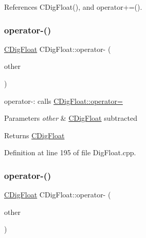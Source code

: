 References C\+Dig\+Float(), and operator+=().

\mbox{\label{classCDigFloat_a8f94e4b416b59090743e59cb9423dbca}} 
\subsubsection{\texorpdfstring{operator-\/()}{operator-()}\hspace{0.1cm}{\footnotesize\ttfamily [1/2]}}
{\footnotesize\ttfamily \hyperlink{classCDigFloat}{C\+Dig\+Float} C\+Dig\+Float\+::operator-\/ (\begin{DoxyParamCaption}\item[{const \hyperlink{classCDigFloat}{C\+Dig\+Float} \&}]{other }\end{DoxyParamCaption})}



operator-\/\+: calls \hyperlink{classCDigFloat_a74f36566c2c79d7258b7b2dee35d46b2}{C\+Dig\+Float\+::operator=} 


\begin{DoxyParams}{Parameters}
{\em other} & \hyperlink{classCDigFloat}{C\+Dig\+Float} subtracted \\
\hline
\end{DoxyParams}
\begin{DoxyReturn}{Returns}
\hyperlink{classCDigFloat}{C\+Dig\+Float} 
\end{DoxyReturn}


Definition at line 195 of file Dig\+Float.\+cpp.

\mbox{\label{classCDigFloat_ad873c5c22f0f18e89caf7309a043bfa0}} 
\subsubsection{\texorpdfstring{operator-\/()}{operator-()}\hspace{0.1cm}{\footnotesize\ttfamily [2/2]}}
{\footnotesize\ttfamily \hyperlink{classCDigFloat}{C\+Dig\+Float} C\+Dig\+Float\+::operator-\/ (\begin{DoxyParamCaption}\item[{const double}]{other }\end{DoxyParamCaption})}



